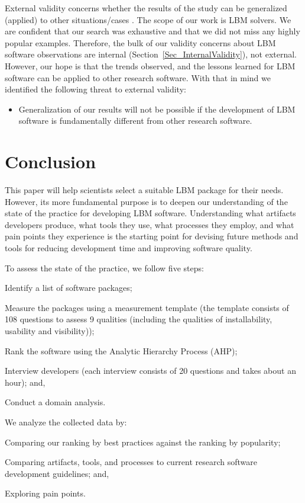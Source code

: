 \documentclass[final, 3p, times, authoryear]{elsarticle}
\begin{document}
External validity concerns whether the results of the study can be generalized
(applied) to other situations/cases \citep{RunesonAndHost2009}.  The scope of
our work is LBM solvers.  We are confident that our search was exhaustive and
that we did not miss any highly popular examples.  Therefore, the bulk of our
validity concerns about LBM software observations are internal
(Section~\ref{Sec_InternalValidity}), not external.  However, our hope is that
the trends observed, and the lessons learned for LBM software can be applied to
other research software.  With that in mind we identified the following threat
to external validity:

\begin{itemize}
\item Generalization of our results will not be possible if the development of
LBM software is fundamentally different from other research software.
\end{itemize}

\section{Conclusion} \label{conclusion}

This paper will help scientists select a suitable LBM package for their needs.
However, its more fundamental purpose is to deepen our understanding of the
state of the practice for developing LBM software. Understanding what artifacts
developers produce, what tools they use, what processes they employ, and what
pain points they experience is the starting point for devising future methods
and tools for reducing development time and improving software quality. 

To assess the state of the practice, we follow five steps:
\begin{inparaenum}[i)]
	\item Identify a list of software packages;
	\item Measure the packages using a measurement template (the template
	consists of 108 questions to assess 9 qualities (including the qualities of
	installability, usability and visibility));
	\item Rank the software using the Analytic Hierarchy Process (AHP);
	\item Interview developers (each interview consists of 20 questions and takes
	about an hour); and, 
	\item Conduct a domain analysis. 
\end{inparaenum}
We analyze the collected data by: 
\begin{inparaenum}[i)]
	\item Comparing our ranking by best practices against the ranking by
	popularity;
	\item Comparing artifacts, tools, and processes to current research software
	development guidelines; and, 
	\item Exploring pain points.
\end{inparaenum}
\end{document}
